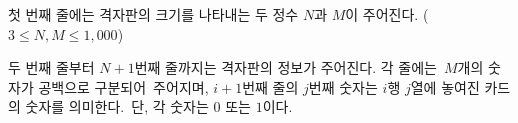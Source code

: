 첫 번째 줄에는 격자판의 크기를 나타내는 두 정수 $N$과 $M$이 주어진다. ($3 \le N, M \le 1,000$)

두 번째 줄부터 $N+1$번째 줄까지는 격자판의 정보가 주어진다. 각 줄에는 $M$개의 숫자가 공백으로 구분되어 주어지며, $i+1$번째 줄의 $j$번째 숫자는 $i$행 $j$열에 놓여진 카드의 숫자를 의미한다. 단, 각 숫자는 $0$ 또는 $1$이다.